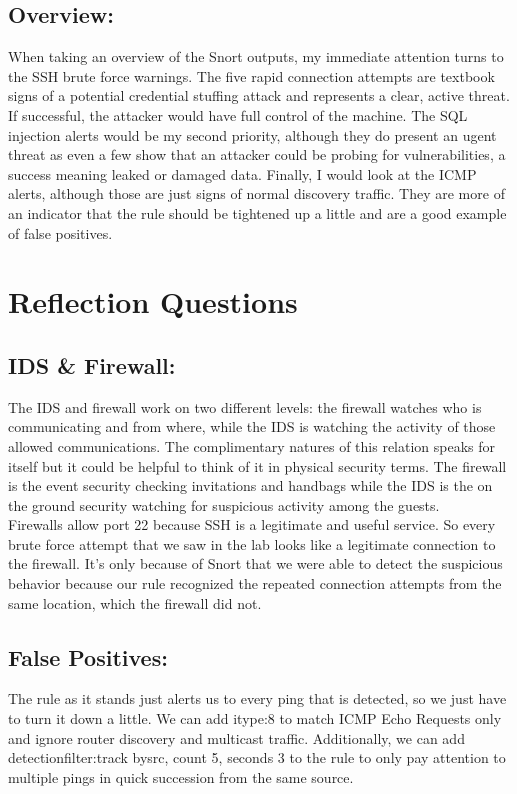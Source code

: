 \documentclass[12pt]{article}
\begin{document}
\subsection{Overview:}
\par When taking an overview of the Snort outputs, my immediate attention turns to the SSH brute force warnings. The five rapid connection attempts are textbook signs of a potential credential stuffing attack and represents a clear, active threat. If successful, the attacker would have full control of the machine. The SQL injection alerts would be my second priority, although they do present an ugent threat as even a few show that an attacker could be probing for vulnerabilities, a success meaning leaked or damaged data. Finally, I would look at the ICMP alerts, although those are just signs of normal discovery traffic. They are more of an indicator that the rule should be tightened up a little and are a good example of false positives.  

\section{Reflection Questions}

\subsection{IDS \& Firewall:}
The IDS and firewall work on two different levels: the firewall watches who is communicating and from where, while the IDS is watching the activity of those allowed communications. The complimentary natures of this relation speaks for itself but it could be helpful to think of it in physical security terms. The firewall is the event security checking invitations and handbags while the IDS is the on the ground security watching for suspicious activity among the guests. \\ Firewalls allow port 22 because SSH is a legitimate and useful service. So every brute force attempt that we saw in the lab looks like a legitimate connection to the firewall. It's only because of Snort that we were able to detect the suspicious behavior because our rule recognized the repeated connection attempts from the same location, which the firewall did not.

\subsection{False Positives:}
The rule as it stands just alerts us to every ping that is detected, so we just have to turn it down a little. We can add itype:8 to match ICMP Echo Requests only and ignore router discovery and multicast traffic. Additionally, we can add detection\underbar{   }filter:track by\underbar{   }src, count 5, seconds 3 to the rule to only pay attention to multiple pings in quick succession from the same source.
\end{document}
